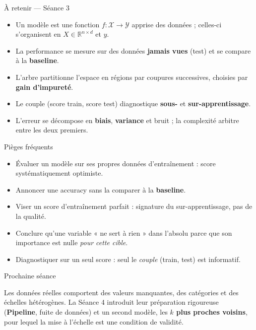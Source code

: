 \documentclass[aspectratio=169,11pt]{beamer}
\begin{document}
\begin{frame}{À retenir — Séance 3}
\begin{ucadret}[L'essentiel]
\begin{itemize}\small
  \item Un modèle est une fonction $f : \mathcal{X} \to \mathcal{Y}$ apprise des données ; celles-ci s'organisent en $X \in \mathbb{R}^{n\times d}$ et $y$.
  \item La performance se mesure sur des données \textbf{jamais vues} (test) et se compare à la \textbf{baseline}.
  \item L'arbre partitionne l'espace en régions par coupures successives, choisies par \textbf{gain d'impureté}.
  \item Le couple (score train, score test) diagnostique \textbf{sous-} et \textbf{sur-apprentissage}.
  \item L'erreur se décompose en \textbf{biais}, \textbf{variance} et bruit ; la complexité arbitre entre les deux premiers.
\end{itemize}
\end{ucadret}
\end{frame}

\begin{frame}{Pièges fréquents}
\begin{itemize}\small
  \item Évaluer un modèle sur ses propres données d'entraînement : score systématiquement optimiste.
  \item Annoncer une accuracy sans la comparer à la \textbf{baseline}.
  \item Viser un score d'entraînement parfait : signature du sur-apprentissage, pas de la qualité.
  \item Conclure qu'une variable « ne sert à rien » dans l'absolu parce que son importance est nulle \emph{pour cette cible}.
  \item Diagnostiquer sur un seul score : seul le \emph{couple} (train, test) est informatif.
\end{itemize}
\end{frame}

\begin{frame}{Prochaine séance}
\begin{ucadfront}
{\small Les données réelles comportent des valeurs manquantes, des catégories et des échelles hétérogènes. La Séance 4 introduit leur préparation rigoureuse (\textbf{Pipeline}, fuite de données) et un second modèle, les \textbf{$k$ plus proches voisins}, pour lequel la mise à l'échelle est une condition de validité.}
\end{ucadfront}
\end{frame}
\end{document}

